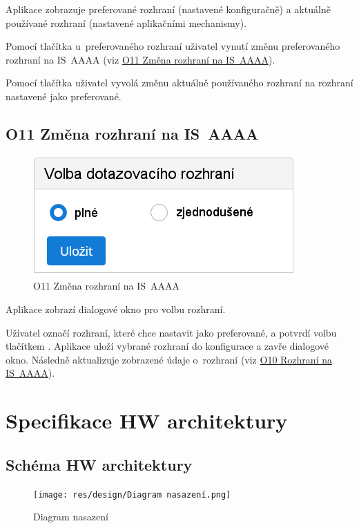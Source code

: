 \documentclass[thesis=M,czech]{FITthesis}[2019/12/23]
\begin{document}
Aplikace zobrazuje preferované rozhraní (nastavené konfiguračně) a aktuálně používané rozhraní (nastavené aplikačními mechanismy).

Pomocí tlačítka  u~preferovaného rozhraní uživatel vynutí změnu preferovaného rozhraní na IS~AAAA (viz \hyperref[O11ZmenaRozhraniNaISAAA]{O11 Změna rozhraní na IS~AAAA}).

Pomocí tlačítka  uživatel vyvolá změnu aktuálně používaného rozhraní na rozhraní nastavené jako preferované.

\newpage
\subsection{O11 Změna rozhraní na IS~AAAA}
\label{O11ZmenaRozhraniNaISAAA}
\begin{figure}[H]
  \centering
  \includegraphics[scale=0.75]{res/screens/O11 Změna rozhraní na IS AAAA.png}
  \caption{O11 Změna rozhraní na IS~AAAA}
  \label{fig:O11 Změna rozhraní na IS~AAAA}
\end{figure}

Aplikace zobrazí dialogové okno pro volbu rozhraní.

Uživatel označí rozhraní, které chce nastavit jako preferované, a potvrdí volbu tlačítkem . Aplikace uloží vybrané rozhraní do konfigurace a zavře dialogové okno. Následně aktualizuje zobrazené údaje o~rozhraní (viz \hyperref[O10RozhraniNaISAAA]{O10 Rozhraní na IS~AAAA}).

\newpage
\section{Specifikace HW architektury}
\subsection{Schéma HW architektury}
\begin{figure}[H]
  \centering
  \texttt{[image: res/design/Diagram nasazení.png]}
  \caption{Diagram nasazení}
  \label{fig:Diagram nasazení}
\end{figure}
\end{document}
